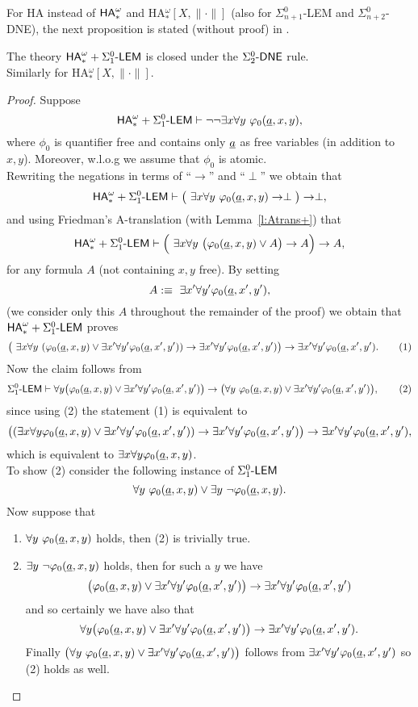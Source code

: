 For HA instead of 
${\textsf{\upshape HA}}^\omega_*$ and HA$_*^{\omega}[X,\|\cdot\|]$ 
(also for $\Sigma^0_{n+1}$-LEM and $\Sigma^0_{n+2}$-DNE), 
the next proposition is stated (without proof) in \cite{Hayashi/Nakata}. 
\begin{prop}\label{p:Atrans}
The theory ${\textsf{\upshape HA}}^\omega_* + \Sigma^0_1\textsf{\upshape -LEM}$ is closed under the $\Sigma^0_2\textsf{\upshape -}\textsf{\upshape DNE}$ rule. \\ 
Similarly for {\rm HA$_*^{\omega}[X,\|\cdot\|].$}
\end{prop}
\begin{proof} 
Suppose \[{\textsf{\upshape HA}}^\omega_* + \Sigma^0_1\textsf{\upshape -LEM} \vdash \neg\neg \exists x\forall y\ \varphi_0(\underline a,x,y),\]
where $\phi_0$ is quantifier free and contains only $\underline a$ as free variables 
(in addition to $x,y$). 
Moreover, w.l.o.g we assume that $\phi_0$ is atomic.  \\
Rewriting the negations in terms of ``$\rightarrow$'' and ``$\perp$'' we obtain that
\[\ha_* + \LEM \vdash \big(\ \exists x\forall y\ \phi_0(\tup a,x,y)\rightarrow\perp\big)\rightarrow \perp,\]
and using Friedman's A-translation (with Lemma~\ref{l:Atrans+}) that
\[\ha_* + \LEM \vdash \Big(\ \exists x\forall y\ \big(\phi_0(\tup a,x,y) \vee A\big)\rightarrow A\Big)\rightarrow A,\]
for any formula $A$ (not containing $x,y$ free). By setting \[A:\equiv\ \exists x'\forall y' \varphi_0(\underline a,x',y'),\]
(we consider only this $A$ throughout the remainder of the proof) we obtain that ${\textsf{\upshape HA}}^\omega_* + \Sigma^0_1\textsf{\upshape -LEM}$ proves
\[\big(\ \exists x\forall y\ (\varphi_0(\underline a,x,y) \vee \exists x'\forall y' \varphi_0(\underline a,x',y'))\rightarrow \exists x'\forall y' \varphi_0(\underline a,x',y')\big)\rightarrow \exists x'\forall y' \varphi_0(\underline a,x',y').\tag{1}\]
Now the claim follows from
\[
\Sigma^0_1\textsf{\upshape -LEM}\vdash \forall y\big(\varphi_0(\underline a,x,y) \vee \exists x'\forall y' \varphi_0(\underline a,x',y') \big) \rightarrow \big(\forall y\ \varphi_0(\underline a,x,y) \vee \exists x'\forall y' \varphi_0(\underline a,x',y')\big),
\tag{2}
\]
since using (2) the statement (1) is equivalent to
\[  \big((\exists x \forall y \varphi_0(\underline a,x,y) \vee \exists x'\forall y' \varphi_0(\underline a,x',y'))\rightarrow \exists x'\forall y' \varphi_0(\underline a,x',y')\big)\rightarrow \exists x'\forall y' \varphi_0(\underline a,x',y'),\]
which is equivalent to $\exists x\forall y \varphi_0(\underline a,x,y)$.\\
To show (2) consider the following instance of $\Sigma^0_1\textsf{\upshape -LEM}$
\[
\forall y\ \varphi_0(\underline a,x,y) \vee \exists y\ \neg\varphi_0(\underline a,x,y).
\]
Now suppose that
\begin{enumerate}
\item $\forall y\ \varphi_0(\underline a,x,y)$ holds, then (2) is trivially true.
\item $\exists y\ \neg \varphi_0(\underline a,x,y)$ holds, then for such a $y$ we have
\[
\big(\varphi_0(\underline a,x,y) \vee \exists x'\forall y' \varphi_0(\underline a,x',y') \big) \rightarrow \exists x'\forall y' \varphi_0(\underline a,x',y')
\]
and so certainly we have also that
\[
\forall y\big(\varphi_0(\underline a,x,y) \vee \exists x'\forall y' \varphi_0(\underline a,x',y') \big) \rightarrow \exists x'\forall y' \varphi_0(\underline a,x',y').
\]
Finally $\big(\forall y\ \varphi_0(\underline a,x,y) \vee \exists x'\forall y' \varphi_0(\underline a,x',y')\big)$ follows from $\exists x'\forall y' \varphi_0(\underline a,x',y')$ so (2) holds as well.
\end{enumerate}
\end{proof}

